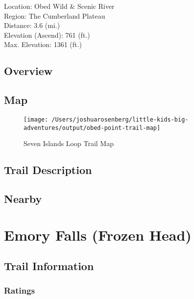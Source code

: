\documentclass[
]{book}
\begin{document}
Location: Obed Wild \& Scenic River\\
Region: The Cumberland Plateau\\
Distance: 3.6 (mi.)\\
Elevation (Ascend): 761 (ft.)\\
Max. Elevation: 1361 (ft.)

\hypertarget{overview-7}{%
\section{Overview}\label{overview-7}}

\hypertarget{map-7}{%
\section{Map}\label{map-7}}

\begin{figure}
\texttt{[image: /Users/joshuarosenberg/little-kids-big-adventures/output/obed-point-trail-map]} \caption{Seven Islands Loop Trail Map}\label{fig:unnamed-chunk-23}
\end{figure}

\hypertarget{trail-description-7}{%
\section{Trail Description}\label{trail-description-7}}

\hypertarget{nearby-7}{%
\section{Nearby}\label{nearby-7}}

\hypertarget{emory-falls-frozen-head}{%
\chapter{Emory Falls (Frozen Head)}\label{emory-falls-frozen-head}}

\hypertarget{trail-information-8}{%
\section{Trail Information}\label{trail-information-8}}

\hypertarget{ratings-3}{%
\subsection{Ratings}\label{ratings-3}}
\end{document}
